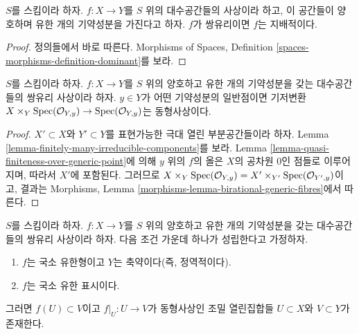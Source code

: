 \begin{lemma}
\label{lemma-birational-dominant}
$S$를 스킴이라 하자.
$f : X \to Y$를 $S$ 위의 대수공간들의 사상이라 하고, 이 공간들이
양호하며 유한 개의 기약성분을 가진다고 하자. $f$가 쌍유리이면
$f$는 지배적이다.
\end{lemma}

\begin{proof}
정의들에서 바로 따른다. Morphisms of Spaces, Definition
\ref{spaces-morphisms-definition-dominant}를 보라.
\end{proof}

\begin{lemma}
\label{lemma-birational-generic-fibres}
$S$를 스킴이라 하자. $f : X \to Y$를 $S$ 위의 양호하고 유한 개의
기약성분을 갖는 대수공간들의 쌍유리 사상이라 하자.
$y \in Y$가 어떤 기약성분의 일반점이면 기저변환
$X \times_Y \mathop{\mathrm{Spec}}(\mathcal{O}_{Y, y}) \to \mathop{\mathrm{Spec}}(\mathcal{O}_{Y, y})$는
동형사상이다.
\end{lemma}

\begin{proof}
$X' \subset X$와 $Y' \subset Y$를 표현가능한 극대 열린
부분공간들이라 하자. Lemma
\ref{lemma-finitely-many-irreducible-components}를 보라.
Lemma \ref{lemma-quasi-finiteness-over-generic-point}에 의해
$y$ 위의 $f$의 올은 $X$의 공차원 $0$인 점들로 이루어지며, 따라서
$X'$에 포함된다. 그러므로
$X \times_Y \mathop{\mathrm{Spec}}(\mathcal{O}_{Y, y}) =
X' \times_{Y'} \mathop{\mathrm{Spec}}(\mathcal{O}_{Y', y})$이고, 결과는 Morphisms,
Lemma \ref{morphisms-lemma-birational-generic-fibres}에서 따른다.
\end{proof}

\begin{lemma}
\label{lemma-birational-birational}
$S$를 스킴이라 하자. $f : X \to Y$를 $S$ 위의 양호하고 유한 개의
기약성분을 갖는 대수공간들의 쌍유리 사상이라 하자.
다음 조건 가운데 하나가 성립한다고 가정하자.
\begin{enumerate}
\item $f$는 국소 유한형이고 $Y$는 축약이다(즉, 정역적이다).
\item $f$는 국소 유한 표시이다.
\end{enumerate}
그러면 $f(U) \subset V$이고 $f|_U : U \to V$가 동형사상인 조밀
열린집합들 $U \subset X$와 $V \subset Y$가 존재한다.
\end{lemma}

